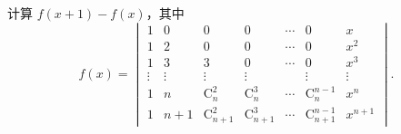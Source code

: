 \begin{example}[2008 山西师范大学]
    计算 $f(x+1)-f(x)$，其中
    $$f(x)=\begin{vmatrix}
            1      & 0      & 0                  & 0                  & \cdots & 0                      & x       \\
            1      & 2      & 0                  & 0                  & \cdots & 0                      & x^2     \\
            1      & 3      & 3                  & 0                  & \cdots & 0                      & x^3     \\
            \vdots & \vdots & \vdots             & \vdots             &        & \vdots                 & \vdots  \\
            1      & n      & \mathrm{C}_n^2     & \mathrm{C}_n^3     & \cdots & \mathrm{C}_n^{n-1}     & x^n     \\
            1      & n+1    & \mathrm{C}_{n+1}^2 & \mathrm{C}_{n+1}^3 & \cdots & \mathrm{C}_{n+1}^{n-1} & x^{n+1}
        \end{vmatrix}.$$
\end{example}
